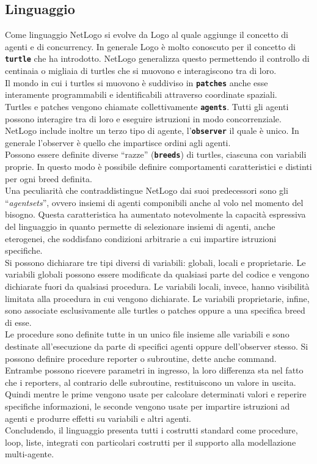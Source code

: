 \subsection{Linguaggio}
Come linguaggio NetLogo si evolve da Logo al quale aggiunge il concetto di agenti e di concurrency. In generale Logo è molto conoscuto per il concetto di \textbf{\texttt{turtle}} che ha introdotto. NetLogo generalizza questo permettendo il controllo di centinaia o migliaia di turtles che si muovono e interagiscono tra di loro.\\
Il mondo in cui i turtles si muovono è suddiviso in \textbf{\texttt{patches}} anche esse interamente programmabili e identificabili attraverso coordinate spaziali.\\
Turtles e patches vengono chiamate collettivamente \textbf{\texttt{agents}}. Tutti gli agenti possono interagire tra di loro e eseguire istruzioni in modo concorrenziale.\\
NetLogo include inoltre un terzo tipo di agente, l'\textbf{\texttt{observer}} il quale è unico. In generale l'observer è quello che impartisce ordini agli agenti.\\
Possono essere definite diverse “razze” (\textbf{\texttt{breeds}}) di turtles, ciascuna con variabili proprie. In questo modo è possibile definire comportamenti caratteristici e distinti per ogni breed definita.\\
Una peculiarità che contraddistingue NetLogo dai suoi predecessori sono gli “\textit{agentsets}”, ovvero insiemi di agenti componibili anche al volo nel momento del bisogno. Questa caratteristica ha aumentato notevolmente la capacità espressiva del linguaggio in quanto permette di selezionare insiemi di agenti, anche eterogenei, che soddisfano condizioni arbitrarie a cui impartire istruzioni specifiche.\\
Si possono dichiarare tre tipi diversi di variabili: globali, locali e proprietarie. Le variabili globali possono essere modificate da qualsiasi parte del codice e vengono dichiarate fuori da qualsiasi procedura. Le variabili locali, invece, hanno visibilità limitata alla procedura in cui vengono dichiarate. Le variabili proprietarie, infine, sono associate esclusivamente alle  turtles o patches oppure a una specifica breed di esse.\\
Le procedure sono definite tutte in un unico file insieme alle variabili e sono destinate all'esecuzione da parte di specifici agenti oppure dell'observer stesso. Si possono definire procedure reporter o subroutine, dette anche command. Entrambe possono ricevere parametri in ingresso, la loro differenza sta nel fatto che i reporters, al contrario delle subroutine, restituiscono un valore in uscita. Quindi mentre le prime vengono usate per calcolare determinati valori e reperire specifiche informazioni, le seconde vengono usate per impartire istruzioni ad agenti e produrre effetti su variabili e altri agenti.\\
Concludendo, il linguaggio presenta tutti i costrutti standard come procedure, loop, liste, integrati con particolari costrutti per il supporto alla modellazione multi-agente.

